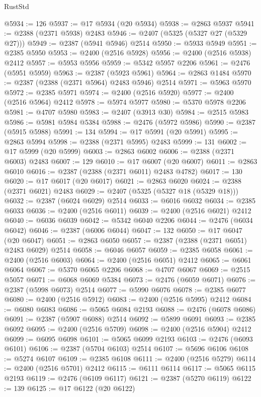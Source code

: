 \begin{lexlean}{RustStd}
\begin{coremodule}
{\begin{coremodule}
{{{{{{{{{{{{{{{{{{{{{{{{{{{{{{{{{{{{{{{{{{{{{{{{{{@5934 := 126
@5937 := @17 @5934 (@20 @5934)
@5938 := @2863 @5937
@5941 := @2388 (@2371 @5938) @2483
@5946 := @2407 (@5325 (@5327 @27 (@5329 @27)))
@5949 := @2387 (@5941 @5946) @2514
@5950 := @5933 @5949
@5951 := @2385 @5950
@5953 := @2400 (@2516 @5928)
@5956 := @2400 (@2516 @5938) @2412
@5957 := @5953 @5956
@5959 := @5342 @5957 @2206
@5961 := @2476 (@5951 @5959)
@5963 := @2387 (@5923 @5961)
@5964 := @2863 @1484
@5970 := @2387 (@2388 (@2371 @5964) @2483 @5946) @2514
@5971 := @5963 @5970
@5972 := @2385 @5971
@5974 := @2400 (@2516 @5920)
@5977 := @2400 (@2516 @5964) @2412
@5978 := @5974 @5977
@5980 := @5370 @5978 @2206
@5981 := @4707 @5980
@5983 := @2407 (@3913 @30)
@5984 := @2515 @5983
@5986 := @5981 @5984 @5384
@5988 := @2476 (@5972 @5986)
@5990 := @2387 (@5915 @5988)
@5991 := 134
@5994 := @17 @5991 (@20 @5991)
@5995 := @2863 @5994
@5998 := @2388 (@2371 @5995) @2483
@5999 := 131
@6002 := @17 @5999 (@20 @5999)
@6003 := @2863 @6002
@6006 := @2388 (@2371 @6003) @2483
@6007 := 129
@6010 := @17 @6007 (@20 @6007)
@6011 := @2863 @6010
@6016 := @2387 (@2388 (@2371 @6011) @2483 @4782)
@6017 := 130
@6020 := @17 @6017 (@20 @6017)
@6021 := @2863 @6020
@6024 := @2388 (@2371 @6021) @2483
@6029 := @2407 (@5325 (@5327 @18 (@5329 @18)))
@6032 := @2387 (@6024 @6029) @2514
@6033 := @6016 @6032
@6034 := @2385 @6033
@6036 := @2400 (@2516 @6011)
@6039 := @2400 (@2516 @6021) @2412
@6040 := @6036 @6039
@6042 := @5342 @6040 @2206
@6044 := @2476 (@6034 @6042)
@6046 := @2387 (@6006 @6044)
@6047 := 132
@6050 := @17 @6047 (@20 @6047)
@6051 := @2863 @6050
@6057 := @2387 (@2388 (@2371 @6051) @2483 @6029) @2514
@6058 := @6046 @6057
@6059 := @2385 @6058
@6061 := @2400 (@2516 @6003)
@6064 := @2400 (@2516 @6051) @2412
@6065 := @6061 @6064
@6067 := @5370 @6065 @2206
@6068 := @4707 @6067
@6069 := @2515 @5057
@6071 := @6068 @6069 @5384
@6073 := @2476 (@6059 @6071)
@6076 := @2387 (@5998 @6073) @2514
@6077 := @5990 @6076
@6078 := @2385 @6077
@6080 := @2400 (@2516 @5912)
@6083 := @2400 (@2516 @5995) @2412
@6084 := @6080 @6083
@6086 := @5065 @6084 @2193
@6088 := @2476 (@6078 @6086)
@6091 := @2387 (@5907 @6088) @2514
@6092 := @5899 @6091
@6093 := @2385 @6092
@6095 := @2400 (@2516 @5709)
@6098 := @2400 (@2516 @5904) @2412
@6099 := @6095 @6098
@6101 := @5065 @6099 @2193
@6103 := @2476 (@6093 @6101)
@6106 := @2387 (@5704 @6103) @2514
@6107 := @5696 @6106
@6108 := @5274 @6107
@6109 := @2385 @6108
@6111 := @2400 (@2516 @5279)
@6114 := @2400 (@2516 @5701) @2412
@6115 := @6111 @6114
@6117 := @5065 @6115 @2193
@6119 := @2476 (@6109 @6117)
@6121 := @2387 (@5270 @6119)
@6122 := 139
@6125 := @17 @6122 (@20 @6122)
}}}}}}}}}}}}}}}}}}}}}}}}}}}}}}}}}}}}}}}}}}}}}}}}}}
\end{coremodule}}
\end{coremodule}
\end{lexlean}
